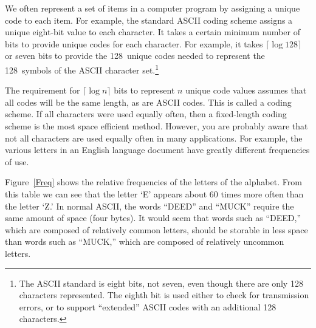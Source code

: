 We often represent a set of items in a computer program
by assigning a unique code to each item.
For example, the standard ASCII coding scheme assigns a unique
eight-bit value to each character.
It takes a certain minimum number of bits to provide unique codes for
each character.
For example, it takes \(\lceil\log 128\rceil\)
or seven bits to provide the 128~unique codes needed to represent the
128~symbols of the ASCII character set.\footnote{The ASCII standard
is eight bits, not seven, even though there are only 128 characters
represented.
The eighth bit is used either to check for transmission errors, or to
support ``extended'' ASCII codes with an additional 128 characters.}

The requirement for \(\lceil\log n\rceil\) bits to represent \(n\)
unique code values assumes that all codes will be the same length,
as are ASCII codes.
This is called a  coding scheme.
If all characters were used equally often, then a fixed-length coding
scheme is the most space efficient method.
However, you are probably aware that not all characters are used
equally often in many applications.
For example, the various letters in an English language document have
greatly different frequencies of use.

Figure~\ref{Freq} shows the relative frequencies of the letters of the
alphabet.
From this table we can see that the letter `E' appears about 60 times
more often than the letter `Z.'
In normal ASCII, the words ``DEED'' and ``MUCK'' require the same
amount of space (four bytes).
It would seem that words such as ``DEED,'' which are composed of
relatively common letters, should be storable in less space than words
such as ``MUCK,'' which are composed of relatively uncommon letters.

